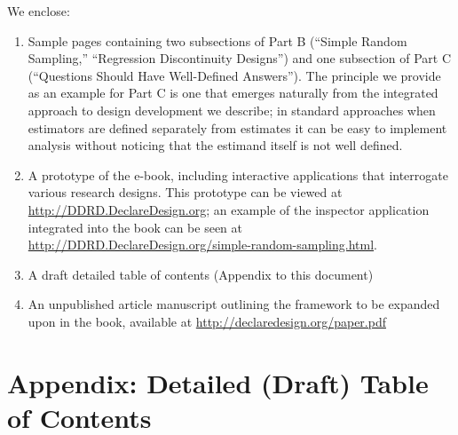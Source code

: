 \documentclass[11pt]{article}
\begin{document}
We enclose:

\begin{enumerate}
\item Sample pages containing two subsections of Part B (``Simple Random Sampling,'' ``Regression Discontinuity Designs'') and one subsection of Part C (``Questions Should Have Well-Defined Answers'').  The principle we provide as an example for Part C is one that emerges naturally from the integrated approach to design development we describe; in standard approaches when estimators are defined separately from estimates it can be easy to implement analysis without noticing that the estimand itself is not well defined.  
\item A prototype of the e-book, including interactive applications that interrogate various research designs. This prototype can be viewed at \url{http://DDRD.DeclareDesign.org}; an example of the inspector application integrated into the book can be seen at \url{http://DDRD.DeclareDesign.org/simple-random-sampling.html}.
\item A draft detailed table of contents (Appendix to this document)
\item An unpublished article manuscript outlining the framework to be expanded upon in the book, available at \url{http://declaredesign.org/paper.pdf}
\end{enumerate}	

\clearpage\newpage


\appendix
\section{Appendix: Detailed (Draft) Table of Contents \label{app:toc}}
\end{document}
